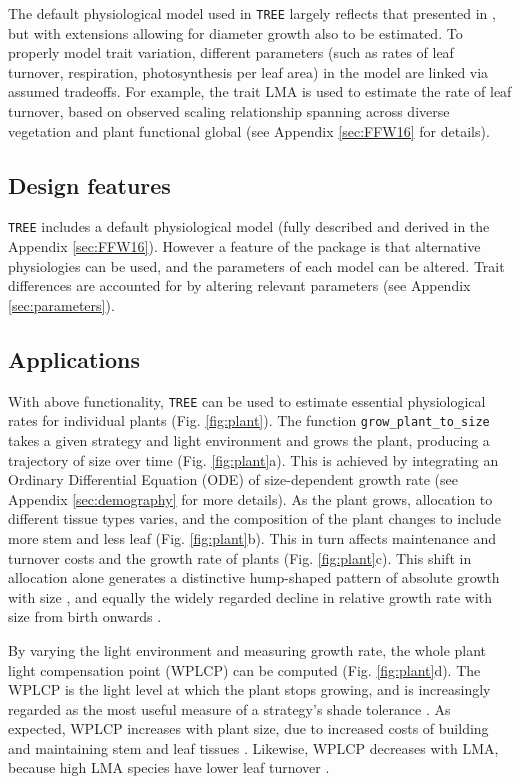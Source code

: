 \documentclass[a4paper,11pt]{article}
\begin{document}
The default physiological model used in \texttt{TREE} largely reflects that
presented in \citet{Falster-2011}, but with extensions allowing for diameter
growth also to be estimated. To properly model trait variation,
different parameters (such as rates of leaf turnover, respiration, photosynthesis 
per leaf area) in the model are linked via assumed tradeoffs. For
example, the trait LMA is used to estimate the rate of leaf turnover,
based on observed scaling relationship spanning across diverse vegetation and
plant functional  global \citep{Wright-2004} (see 
Appendix \ref{sec:FFW16} for details).

\subsection{Design features}

\texttt{TREE} includes a default physiological model (fully described and derived
in the Appendix \ref{sec:FFW16}). However a feature of the package is that alternative
physiologies can be used, and the parameters of each model can be
altered. Trait differences are accounted for by altering relevant
parameters (see Appendix \ref{sec:parameters}).

\subsection{Applications}

With above functionality, \texttt{TREE} can be used to estimate essential
physiological rates for individual plants (Fig. \ref{fig:plant}). The
function \texttt{grow\_plant\_to\_size} takes a given strategy and light
environment and grows the plant, producing a trajectory of size over
time (Fig. \ref{fig:plant}a). This is achieved by integrating an
Ordinary Differential Equation (ODE) of size-dependent growth rate (see
Appendix \ref{sec:demography} for more
details). As the plant grows, allocation to different tissue types varies, and
the composition of the plant changes to include more stem and less
leaf (Fig. \ref{fig:plant}b). This in turn affects maintenance and
turnover costs and the growth rate of plants (Fig. \ref{fig:plant}c).
This shift in allocation alone generates a distinctive hump-shaped pattern of absolute
growth with size \citep{King-2011}, and equally the widely regarded
decline in relative growth rate with size from birth onwards
\citep{Enquist-2007}.

By varying the light environment and measuring growth rate, the whole
plant light compensation point (WPLCP) can be computed (Fig.
\ref{fig:plant}d). The WPLCP is the light level at which the plant 
stops growing, and is increasingly regarded as the most useful
measure of a strategy's shade tolerance
\citep{Givnish-1988, Baltzer-2007, Lusk-2013}. As expected, WPLCP
increases with plant size, due to increased costs of building and
maintaining stem and leaf tissues \citep{Givnish-1988}. Likewise, WPLCP
decreases with LMA, because high LMA species have lower leaf turnover
\citep{Baltzer-2007, Lusk-2013}.
\end{document}
